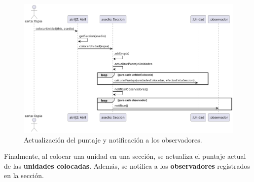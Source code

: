 \documentclass[titlepage,a4paper]{article}
\begin{document}
	\begin{figure}[H]
		\centering
		\includegraphics[width=1\textwidth]{diagramas/secuencia/jugarCarta4}
		\caption{\label{fig:secuencia04} Actualización del puntaje y notificación a los observadores.}
	\end{figure}
	Finalmente, al colocar una unidad en una sección, se actualiza el puntaje actual de las \textbf{unidades colocadas}. Además, se notifica a los \textbf{observadores} registrados en la sección.
\end{document}
